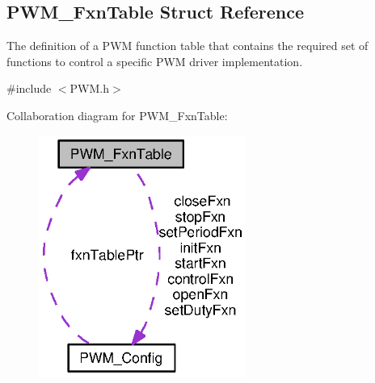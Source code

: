 \subsection{P\+W\+M\+\_\+\+Fxn\+Table Struct Reference}
\label{struct_p_w_m___fxn_table}


The definition of a P\+W\+M function table that contains the required set of functions to control a specific P\+W\+M driver implementation.  




{\ttfamily \#include $<$P\+W\+M.\+h$>$}



Collaboration diagram for P\+W\+M\+\_\+\+Fxn\+Table\+:
\nopagebreak
\begin{figure}[H]
\begin{center}
\leavevmode
\includegraphics[width=192pt]{struct_p_w_m___fxn_table__coll__graph}
\end{center}
\end{figure}

